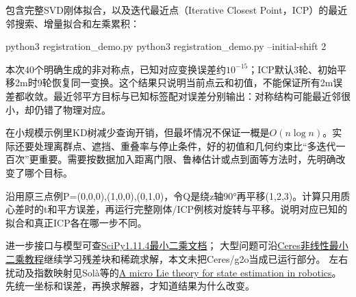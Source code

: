 \begin{example}
包含完整SVD刚体拟合，以及迭代最近点（Iterative Closest Point，ICP）的最近邻搜索、增量拟合和左乘累积：

\begin{tbash}
python3 registration_demo.py
python3 registration_demo.py --initial-shift 2
\end{tbash}
本次40个明确生成的非对称点，已知对应变换误差约$10^{-15}$；ICP默认3轮、初始平移2m时9轮恢复同一变换。这个结果只说明当前点云和初值，不能保证所有2m误差都收敛。最近邻平方目标与已知标签配对误差分别输出：对称结构可能最近邻很小，却仍错了物理对应。

在小规模示例里KD树减少查询开销，但最坏情况不保证一概是$O(n\log n)$。实际还要处理离群点、遮挡、重叠率与停止条件，好的初值和几何约束比“多迭代一百次”更重要。需要按数据加入距离门限、鲁棒估计或点到面等方法时，先明确改变了哪个目标。
\end{example}
\begin{exercise}\label{ex:v2-ba-registration}
沿用原三点例P={(0,0,0),(1,0,0),(0,1,0)}，令Q是绕z轴90°再平移(1,2,3)。计算只用质心差时的t和平方误差，再运行完整刚体/ICP例核对旋转与平移。说明对应已知的拟合和真正ICP各在哪一步不同。
\end{exercise}
\begin{note}
进一步接口与模型可查\href{https://docs.scipy.org/doc/scipy-1.11.4/reference/generated/scipy.optimize.least_squares.html}{SciPy1.11.4最小二乘文档}；
大型问题可沿\href{https://ceres-solver.readthedocs.io/latest/nnls_tutorial.html}{Ceres非线性最小二乘教程}继续学习残差块和稀疏求解，本文未把Ceres/g2o当成已运行部分。
左右扰动及指数映射见Solà等的\href{https://arxiv.org/abs/1812.01537}{A micro Lie theory for state estimation in robotics}。
先统一坐标和误差，再换求解器，才知道结果为什么改变。
\end{note}
